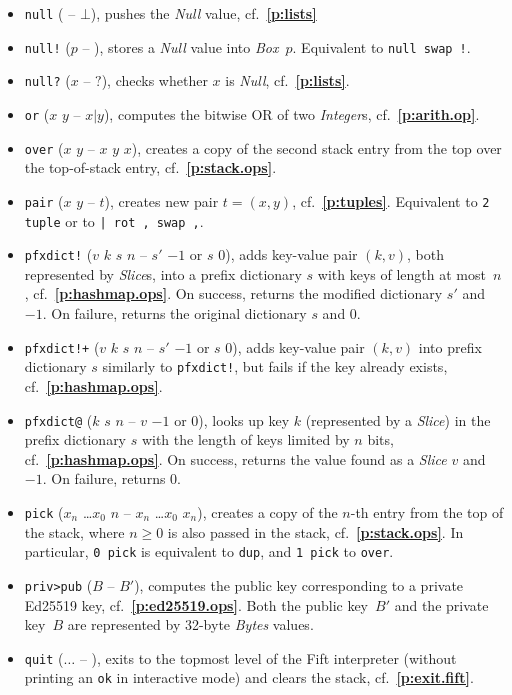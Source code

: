 \documentclass[12pt,oneside]{article}
\def\refpoint#1{{\rm\textbf{\ref{#1}}}}
\let\ptref=\refpoint
\begin{document}
\begin{itemize}
\item {\tt null} ( -- $\bot$), pushes the {\em Null\/} value, cf.~\ptref{p:lists}
\item {\tt null!} ($p$ -- ), stores a {\em Null\/} value into {\em Box\/}~$p$. Equivalent to {\tt null swap !}.
\item {\tt null?} ($x$ -- $?$), checks whether $x$ is {\em Null}, cf.~\ptref{p:lists}.
\item {\tt or} ($x$ $y$ -- $x|y$), computes the bitwise OR of two {\em Integer\/}s, cf.~\ptref{p:arith.op}.
\item {\tt over} ($x$ $y$ -- $x$ $y$ $x$), creates a copy of the second stack entry from the top over the top-of-stack entry, cf.~\ptref{p:stack.ops}.
\item {\tt pair} ($x$ $y$ -- $t$), creates new pair $t=(x,y)$, cf.~\ptref{p:tuples}. Equivalent to {\tt 2 tuple} or to {\tt | rot , swap ,}.
\item {\tt pfxdict!} ($v$ $k$ $s$ $n$ -- $s'$ $-1$ or $s$ $0$), adds key-value pair $(k,v)$, both represented by {\em Slice\/}s, into a prefix dictionary $s$ with keys of length at most~$n$, cf.~\ptref{p:hashmap.ops}. On success, returns the modified dictionary $s'$ and $-1$. On failure, returns the original dictionary $s$ and $0$.
\item {\tt pfxdict!+} ($v$ $k$ $s$ $n$ -- $s'$ $-1$ or $s$ $0$), adds key-value pair $(k,v)$ into prefix dictionary $s$ similarly to {\tt pfxdict!}, but fails if the key already exists, cf.~\ptref{p:hashmap.ops}.
\item {\tt pfxdict@} ($k$ $s$ $n$ -- $v$ $-1$ or $0$), looks up key $k$ (represented by a {\em Slice\/}) in the prefix dictionary $s$ with the length of keys limited by $n$ bits, cf.~\ptref{p:hashmap.ops}. On success, returns the value found as a {\em Slice\/} $v$ and $-1$. On failure, returns $0$.
\item {\tt pick} ($x_n$ \dots $x_0$ $n$ -- $x_n$ \dots $x_0$ $x_n$), creates a copy of the $n$-th entry from the top of the stack, where $n\geq0$ is also passed in the stack, cf.~\ptref{p:stack.ops}. In particular, {\tt 0 pick} is equivalent to {\tt dup}, and {\tt 1 pick} to {\tt over}.
\item {\tt priv>pub} ($B$ -- $B'$), computes the public key corresponding to a private Ed25519 key, cf.~\ptref{p:ed25519.ops}. Both the public key~$B'$ and the private key~$B$ are represented by 32-byte {\em Bytes\/} values.
\item {\tt quit} ($\dots$ -- ), exits to the topmost level of the Fift interpreter (without printing an {\tt ok} in interactive mode) and clears the stack, cf.~\ptref{p:exit.fift}.

\end{itemize}
\end{document}
